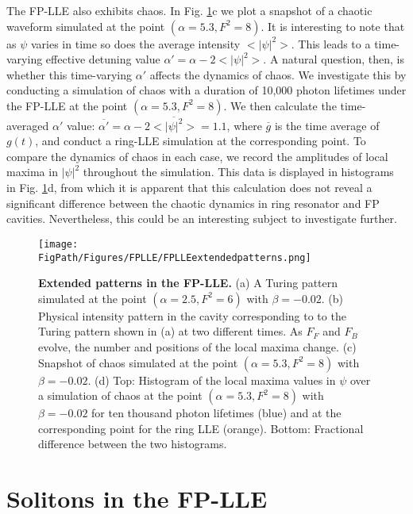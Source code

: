 The FP-LLE also exhibits chaos. In Fig. \ref{fig:FPLLEextendedpatterns}c we plot a snapshot of a chaotic waveform simulated at the point $(\alpha=5.3, F^2=8)$. It is interesting to note that as $\psi$ varies in time so does the average intensity $<|\psi|^2>$. This leads to a time-varying effective detuning value $\alpha'=\alpha-2<|\psi|^2>$. A natural question, then, is whether this time-varying $\alpha'$ affects the dynamics of chaos. We investigate this by conducting a simulation of chaos with a duration of 10,000 photon lifetimes under the FP-LLE at the point $(\alpha=5.3, F^2=8)$. We then calculate the time-averaged $\alpha'$ value: $\overline{\alpha'}=\alpha-2\overline{<|\psi|^2>}=1.1$, where $\overline{g}$ is the time average of $g(t)$, and conduct a ring-LLE simulation at the corresponding point. To compare the dynamics of chaos in each case, we record the amplitudes of local maxima in $|\psi|^2$ throughout the simulation. This data is displayed in histograms in Fig. \ref{fig:FPLLEextendedpatterns}d, from which it is apparent that this calculation does not reveal a significant difference between the chaotic dynamics in ring resonator and FP cavities. Nevertheless, this could be an interesting subject to investigate further. 


\begin{figure}[htpb]
	\begin{center}
		\texttt{[image: \\FigPath/Figures/FPLLE/FPLLEextendedpatterns.png]}
	\end{center}
	\caption[Extended patterns in the FP-LLE]{\textbf{Extended patterns in the FP-LLE.} (a) A Turing pattern simulated at the point $(\alpha=2.5,F^2=6)$ with $\beta=-0.02$. (b) Physical intensity pattern in the cavity corresponding to to the Turing pattern shown in (a) at two different times. As $F_F$ and $F_B$ evolve, the number and positions of the local maxima change. (c) Snapshot of chaos simulated at the point $(\alpha=5.3,F^2=8)$ with $\beta=-0.02$. (d) Top: Histogram of the local maxima values in $\psi$ over a simulation of chaos at the point $(\alpha=5.3,F^2=8)$ with $\beta=-0.02$ for ten thousand photon lifetimes (blue) and at the corresponding point for the ring LLE (orange). Bottom: Fractional difference between the two histograms.}
	\label{fig:FPLLEextendedpatterns}
\end{figure} 

\section{Solitons in the FP-LLE}


